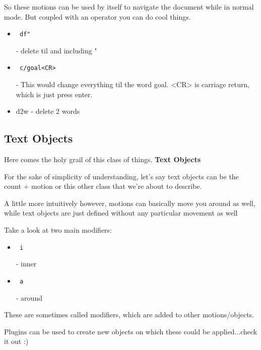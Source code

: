 \documentclass[12pt, letterpaper]{article}
\begin{document}
So these motions can be used by itself to navigate the document while in normal mode. But coupled with an operator you can do cool things.


\begin{itemize}
    \item \begin{verbatim} df" \end{verbatim} - delete til and including " 
    \item \begin{verbatim} c/goal<CR> \end{verbatim} -  This would change everything til the word goal. <CR> is carriage return, which is just press enter. 
    \item d2w - delete 2 words
\end{itemize}

\subsection{Text Objects}
Here comes the holy grail of this class of things. \textbf{Text Objects}

For the sake of simplicity of understanding, let's say text objects can be the count + motion or this other class that we're about to describe.

A little more intuitively however, motions can basically move you around as well, while text objects are just defined without any particular movement as well


Take a look at two main modifiers:
\begin{itemize}
    \item \begin{verbatim} i \end{verbatim} - inner 
    \item \begin{verbatim} a \end{verbatim} - around
\end{itemize}
These are sometimes called modifiers, which are added to other motions/objects.

Plugins can be used to create new objects on which these could be applied...check it out :)
\end{document}

